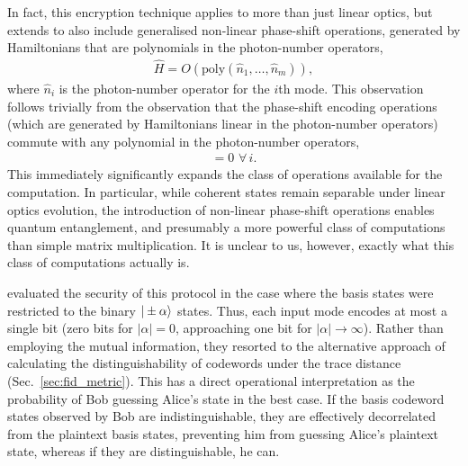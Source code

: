 In fact, this encryption technique applies to more than just linear optics, but extends to also include generalised non-linear phase-shift operations, generated by Hamiltonians that are polynomials in the photon-number operators,
\begin{align}
\hat{H} = O(\text{poly}(\hat{n}_1,\dots,\hat{n}_m)),
\end{align}
where $\hat{n}_i$ is the photon-number operator for the $i$th mode. This observation follows trivially from the observation that the phase-shift encoding operations (which are generated by Hamiltonians linear in the photon-number operators) commute with any polynomial in the photon-number operators,
\begin{align}
[\hat{n}_i,\text{poly}(\hat{n}_1,\dots,\hat{n}_m)] = 0\,\,\forall \, i.
\end{align}
This immediately significantly expands the class of operations available for the computation. In particular, while coherent states remain separable under linear optics evolution, the introduction of non-linear phase-shift operations enables quantum entanglement, and presumably a more powerful class of computations than simple matrix multiplication. It is unclear to us, however, exactly what this class of computations actually is.

\cite{siHuiTan} evaluated the security of this protocol in the case where the basis states were restricted to the binary $|\pm\alpha\rangle$ states. Thus, each input mode encodes at most a single bit (zero bits for \mbox{$|\alpha|=0$}, approaching one bit for \mbox{$|\alpha|\to\infty$}). Rather than employing the mutual information, they resorted to the alternative approach of calculating the distinguishability of codewords under the trace distance (Sec.~\ref{sec:fid_metric}). This has a direct operational interpretation as the probability of Bob guessing Alice's state in the best case. If the basis codeword states observed by Bob are indistinguishable, they are effectively decorrelated from the plaintext basis states, preventing him from guessing Alice's plaintext state, whereas if they are distinguishable, he can.

